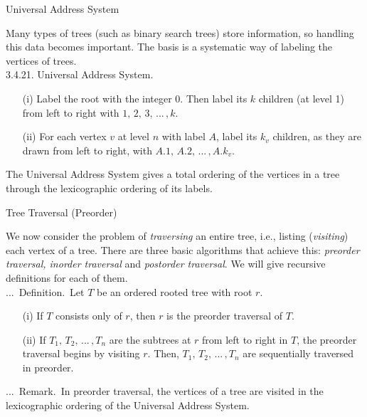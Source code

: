 \documentclass[smaller,hyperref={CJKbookmarks=true}]{beamer}
\newcounter{zhuo}[subsection]
\renewcommand{\thezhuo}{\thesection.\thesubsection.\arabic{zhuo}}
\newenvironment{DEFINITION}{\stepcounter{zhuo}\alert{\thezhuo.~Definition.\,}}{}
\newenvironment{REMARK}{\stepcounter{zhuo}\alert{\thezhuo.~Remark.\,}}{}
\begin{document}
\begin{frame}[c]{Universal Address System}
\begin{spacing}{1.1}
Many types of trees (such as binary search trees) store information, so
handling this data becomes important. The basis is a systematic way of
labeling the vertices of trees.\\[7pt]
\alert{3.4.21. Universal Address System.}
\begin{itemize}
  \item[(i)] Label the root with the integer 0. Then label its $k$ children (at level 1) from left to right with $1,\,2,\,3,\,...\,,k$.
  \item[(ii)] For each vertex $v$ at level $n$ with label $A$, label its $k_v$ children, as they are drawn from left to right, with $A.1,\,A.2,\,...\,,A.k_v$.
\end{itemize}
\vspace*{5pt}
The Universal Address System gives a total ordering of the vertices in a
tree through the lexicographic ordering of its labels.
\end{spacing}
\end{frame}
\begin{frame}[c]{Tree Traversal (Preorder)}
\begin{spacing}{1.1}
We now consider the problem of \emph{traversing} an entire tree, i.e., listing
(\emph{visiting}) each vertex of a tree. There are three basic algorithms that
achieve this: \emph{preorder traversal, inorder traversal} and \emph{postorder traversal}.
We will give recursive definitions for each of them.\\[6pt]
\begin{DEFINITION}
Let $T$ be an ordered rooted tree with root $r$.
\begin{itemize}
  \item[(i)] If $T$ consists only of $r$, then $r$ is the preorder traversal of $T$.
  \item[(ii)] If $T_1,\,T_2,\,...\,,T_n$ are the subtrees at $r$ from left to right in $T$, the preorder traversal begins by visiting $r$. Then, $T_1,\,T_2,\,...\,,T_n$ are sequentially traversed in preorder.
\end{itemize}
\vspace*{6pt}
\begin{REMARK}
In preorder traversal, the vertices of a tree are visited in
the lexicographic ordering of the Universal Address System.
\end{REMARK}
\end{DEFINITION}
\end{spacing}
\end{frame}
\end{document}
